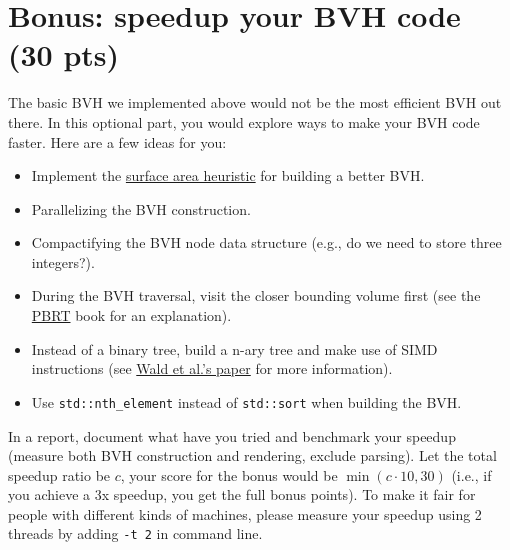 \section{Bonus: speedup your BVH code (30 pts)}
The basic BVH we implemented above would not be the most efficient BVH out there. In this optional part, you would explore ways to make your BVH code faster. Here are a few ideas for you:
\begin{itemize}
  \item Implement the \href{https://www.pbr-book.org/3ed-2018/Primitives_and_Intersection_Acceleration/Bounding_Volume_Hierarchies#TheSurfaceAreaHeuristic}{surface area heuristic} for building a better BVH.
  \item Parallelizing the BVH construction.
  \item Compactifying the BVH node data structure (e.g., do we need to store three integers?).
  \item During the BVH traversal, visit the closer bounding volume first (see the \href{https://www.pbr-book.org/3ed-2018/Primitives_and_Intersection_Acceleration/Bounding_Volume_Hierarchies#Traversal}{PBRT} book for an explanation).
  \item Instead of a binary tree, build a n-ary tree and make use of SIMD instructions (see \href{http://www.cs.cmu.edu/afs/cs/academic/class/15869-f11/www/readings/wald08_widebvh.pdf}{Wald et al.'s paper} for more information).
  \item Use \lstinline{std::nth_element} instead of \lstinline{std::sort} when building the BVH.
\end{itemize}

In a report, document what have you tried and benchmark your speedup (measure both BVH construction and rendering, exclude parsing).
Let the total speedup ratio be $c$, your score for the bonus would be $\min(c \cdot 10, 30)$ (i.e., if you achieve a 3x speedup, you get the full bonus points).
To make it fair for people with different kinds of machines, please measure your speedup using 2 threads by adding \lstinline{-t 2} in command line.

%
%


